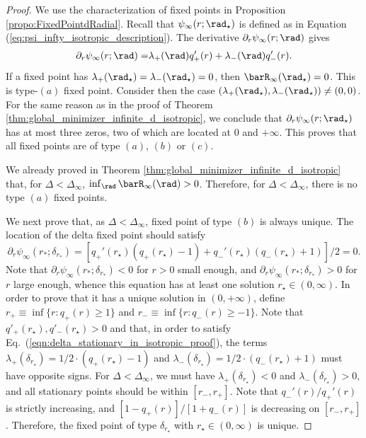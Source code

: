 \documentclass[11pt]{article}
\begin{document}
\begin{proof}
We use the characterization of fixed points in Proposition \ref{propo:FixedPointdRadial}.
Recall that $\psi_\infty(r; \rad_\star)$ is defined as in Equation (\ref{eq:psi_infty_isotropic_description}). The derivative $\partial_r \psi_\infty(r; \rad)$ gives
\begin{equation}\label{eqn:stationary_in_isotropic_proof}
\begin{aligned}
\partial_{r} \psi_\infty(r; \rad) =& \lambda_+(\rad) q_+'(r) + \lambda_-(\rad) q_-'(r).\\
\end{aligned}
\end{equation}
%
If a fixed point has $\lambda_+(\rad_\star) = \lambda_-(\rad_\star)=0$, then $\barR_\infty(\rad_\star)=0$. This is type-$(a)$ fixed point. 
Consider then the case $(\lambda_+(\rad_\star), \lambda_-(\rad_\star)) \neq (0, 0)$.
For the same reason as in the proof of Theorem \ref{thm:global_minimizer_infinite_d_isotropic},
we conclude that $\partial_r \psi_\infty(r; \rad_\star)$ has at most three zeros, two of which are located at $0$ and $+\infty$. 
This proves that all fixed points are of type $(a)$, $(b)$ or $(c)$. 

We already proved in Theorem \ref{thm:global_minimizer_infinite_d_isotropic}  that, for $\Delta < \Delta_\infty$, $\inf_{\rad}\barR_\infty(\rad)>0$. 
Therefore, for $\Delta < \Delta_\infty$, there is no type $(a)$   fixed points. 


We next prove that, as $\Delta < \Delta_\infty$, fixed point of type $(b)$ is always unique. The location of the delta fixed point should satisfy
\begin{equation}\label{eqn:delta_stationary_in_isotropic_proof}
\partial_r\psi_{\infty}(r_*;\delta_{r_*})= [q_+'(r_\star)(q_+(r_\star) -1) + q_-'(r_\star)(q_-(r_\star) +1)]/2 = 0.
\end{equation}
%
Note that $\partial_r\psi_{\infty}(r_*;\delta_{r_*})< 0$ for $r > 0$ small enough, and $\partial_r\psi_{\infty}(r_*;\delta_{r_*})> 0$ for $r$ large enough, whence this equation 
has at least one solution $r_\star \in (0, \infty)$. 
In order to prove that it  has a unique solution in $(0, +\infty)$, define $r_+ \equiv \inf\{r: q_+(r) \ge 1\}$ and $r_- \equiv \inf\{r: q_-(r) \ge -1\}$. 
Note that $q'_+(r_\star),q'_-(r_\star)>0$ and that, in order to satisfy Eq.~(\ref{eqn:delta_stationary_in_isotropic_proof}), the terms $\lambda_+(\delta_{r_\star}) = 1/2 \cdot (q_+(r_\star) -1)$ and
$\lambda_-(\delta_{r_\star}) = 1/2 \cdot (q_-(r_\star) + 1)$ must have opposite signs.
For $\Delta < \Delta_\infty$, we must have $\lambda_+(\delta_{r_\star}) < 0$ and $\lambda_-(\delta_{r_\star}) > 0$, and all stationary points should be within $[r_-, r_+]$. Note that $q_-'(r) / q_+'(r)$ is strictly increasing, and $[1 - q_+(r)]/[1 + q_-(r)]$ is decreasing on $[r_-, r_+]$. Therefore, the fixed point of type $\delta_{r_\star}$ with $r_\star \in (0, \infty)$ is unique. 


\end{proof}
\end{document}
